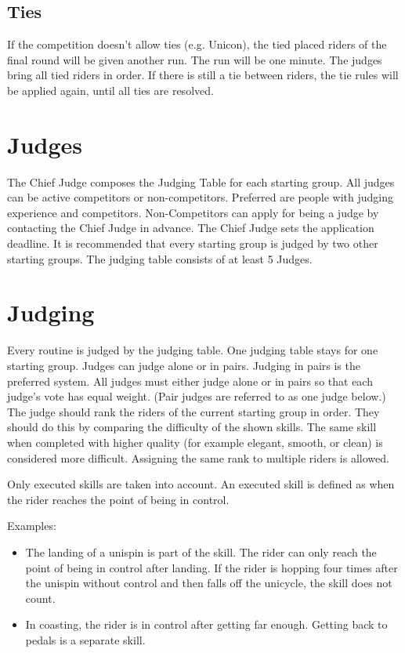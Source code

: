 \subsection{Ties}
If the competition doesn't allow ties (e.g. Unicon), the tied placed riders of the final round will be given another run.
The run will be one minute.
The judges bring all tied riders in order.
If there is still a tie between riders, the tie rules will be applied again, until all ties are resolved.

\section{Judges}
The Chief Judge composes the Judging Table for each starting group.
All judges can be active competitors or non-competitors.
Preferred are people with judging experience and competitors.
Non-Competitors can apply for being a judge by contacting the Chief Judge in advance.
The Chief Judge sets the application deadline.
It is recommended that every starting group is judged by two other starting groups.
The judging table consists of at least 5 Judges.

\section{Judging}
Every routine is judged by the judging table.
One judging table stays for one starting group.
Judges can judge alone or in pairs.
Judging in pairs is the preferred system.
All judges must either judge alone or in pairs so that each judge's vote has equal weight.
(Pair judges are referred to as one judge below.)
The judge should rank the riders of the current starting group in order.
They should do this by comparing the difficulty of the shown skills.
The same skill when completed with higher quality (for example elegant, smooth, or clean) is considered more difficult.
Assigning the same rank to multiple riders is allowed.

Only executed skills are taken into account.
An executed skill is defined as when the rider reaches the point of being in control.

Examples:
\begin{itemize}
\item The landing of a unispin is part of the skill.
The rider can only reach the point of being in control after landing.
If the rider is hopping four times after the unispin without control and then falls off the unicycle, the skill does not count.
\item In coasting, the rider is in control after getting far enough.
Getting back to pedals is a separate skill.
\end{itemize}

